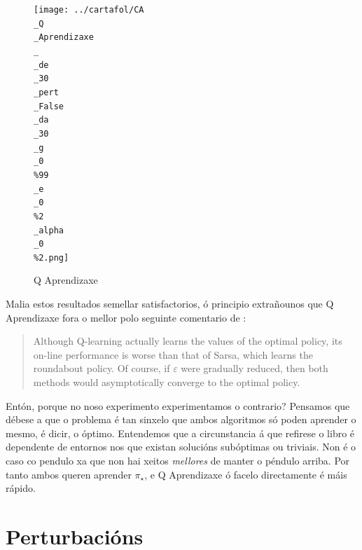 \documentclass{article}
\begin{document}
\begin{figure}[htbp]
\begin{minipage}{0.45\textwidth}
    \end{minipage}
    \hfill
    \begin{minipage}{0.45\textwidth}
        \centering
	\texttt{[image: ../cartafol/CA\\\_Q\\\_Aprendizaxe\\\_\\\_de\\\_30\\\_pert\\\_False\\\_da\\\_30\\\_g\\\_0\\\%99\\\_e\\\_0\\\%2\\\_alpha\\\_0\\\%2.png]}
\caption*{Q Aprendizaxe}

    \end{minipage}
\end{figure}

\newpage

Malia estos resultados semellar satisfactorios, ó principio extrañounos que Q Aprendizaxe fora o mellor polo seguinte comentario de \cite{Sutton1998}:

\begin{quote}
Although Q-learning actually learns the values of the optimal policy, its on-line performance is worse than that of Sarsa, which learns the roundabout policy. Of course, if $\varepsilon$ were gradually reduced, then both methods would asymptotically converge to the optimal policy.
\end{quote}

Entón, porque no noso experimento experimentamos o contrario? Pensamos que débese a que o problema é tan sinxelo que ambos algoritmos só poden aprender o mesmo, é dicir, o óptimo. Entendemos que a circunstancia á que refirese o libro é dependente de entornos nos que existan solucións subóptimas ou triviais. Non é o caso co pendulo xa que non hai xeitos \emph{mellores} de manter o péndulo arriba. Por tanto ambos queren aprender $\pi_{\star}$, e Q Aprendizaxe ó facelo directamente é máis rápido.

\section{Perturbacións}
\end{document}
